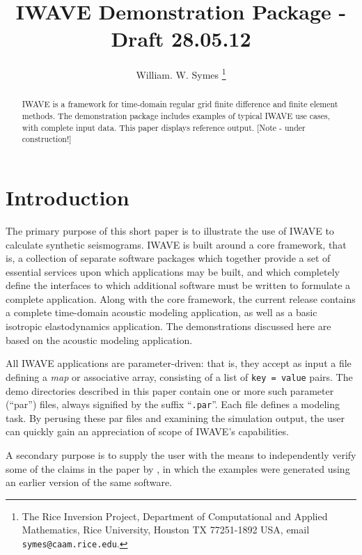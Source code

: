 \title{IWAVE Demonstration Package - Draft 28.05.12}
\author{William. W. Symes \thanks{The Rice Inversion Project,
Department of Computational and Applied Mathematics, Rice University,
Houston TX 77251-1892 USA, email {\tt symes@caam.rice.edu}.}}

\maketitle

\begin{abstract}
IWAVE is a framework for time-domain regular grid finite difference and finite element methods. The demonstration package includes examples of typical IWAVE use cases, with complete input data. This paper displays reference output. [Note - under construction!]
\end{abstract}

\section{Introduction}
The primary purpose of this short paper is to illustrate the use of IWAVE to calculate synthetic seismograms. IWAVE is built around a core framework, that is, a collection of separate software packages which together provide a set of essential services upon which applications may be built, and which completely define the interfaces to which additional software must be written to formulate a complete application. Along with the core framework, the current release contains a complete time-domain acoustic modeling application, as well as a basic isotropic elastodynamics application.
The demonstrations discussed here are based on the acoustic modeling application.

All IWAVE applications are parameter-driven: that is, they accept as input a file defining a {\em map} or associative array, consisting of a list of {\tt key = value} pairs. The demo directories described in this paper contain one or more such parameter (``par'') files, always signified by the suffix ``{\tt .par}''. Each file defines a modeling task. By perusing these par files and examining the simulation output, the user can quickly gain an appreciation of scope of IWAVE's capabilities. 

A secondary purpose is to supply the user with the means to independently verify some of the claims in the paper by \cite{SymesVdovina:09}, in which the examples were generated using an earlier version of the same software.

